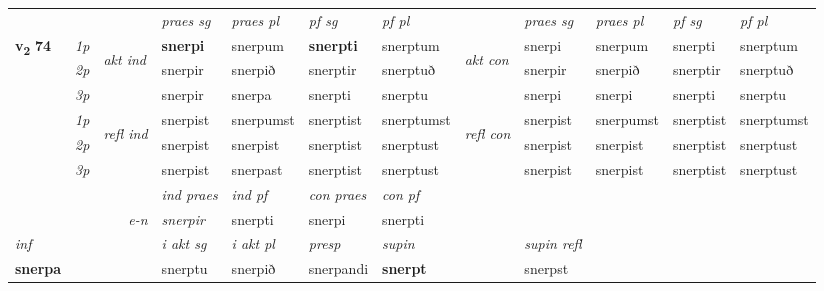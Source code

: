 \begin{longtable}[l]{X>{\footnotesize\itshape}llXXXXlXXXX}
 & &   & \textit{praes sg}  & \textit{praes pl}    & \textit{ pf sg} & \textit{pf pl} & & \textit{praes sg}  & \textit{praes pl}    & \textit{pf sg} & \textit{pf pl }  \\ \cmidrule{4-7} \cmidrule{9-12}
 \multirow{2}{*}{{{\textbf{v{\textsubscript{2}}} \Large{\textbf{74}}}}}  & 1p & \multirow{3}{*}{\begin{turn}{90}\textit{akt ind}\end{turn}} & \textbf{snerpi} & snerpum & \textbf{snerpti} & snerptum & \multirow{3}{*}{\begin{turn}{90}\textit{akt con}\end{turn}} &snerpi & snerpum & snerpti & snerptum\\*
 & 2p &  &  snerpir  & snerpið & snerptir & snerptuð & & snerpir & snerpið & snerptir & snerptuð \\*
 & 3p &  & snerpir & snerpa & snerpti & snerptu & & snerpi & snerpi& snerpti & snerptu \\*
\cmidrule{4-7} \cmidrule{9-12}
 & 1p & \multirow{3}{*}{\begin{turn}{90}\textit{refl ind}\end{turn}}  & snerpist & snerpumst & snerptist & snerptumst & \multirow{3}{*}{\begin{turn}{90}\textit{refl con}\end{turn}}  &snerpist & snerpumst & snerptist & snerptumst \\*
 & 2p &  & snerpist & snerpist & snerptist & snerptust & &snerpist & snerpist & snerptist & snerptust \\*
 & 3p  & & snerpist & snerpast & snerptist & snerptust & & snerpist & snerpist& snerptist & snerptust \\*
\cmidrule{4-7} \cmidrule{9-12}

   && &  \textit{ind praes} & \textit{ind pf} & \textit{con praes} & \textit{con pf} \\*
\multicolumn{3}{r}{\textit{e-n}} & snerpir & snerpti & snerpi & snerpti \\*

\cmidrule{4-7}
   {\textit{inf}} & &  & \textit{i akt sg} & \textit{i akt pl}   & \textit{presp} & \textit{supin} && \textit{supin refl}  \\*
  {\textbf{snerpa}} & && snerptu  & snerpið   & snerpandi &  \textbf{snerpt} && snerpst  \\*

\midrule


\end{longtable}
